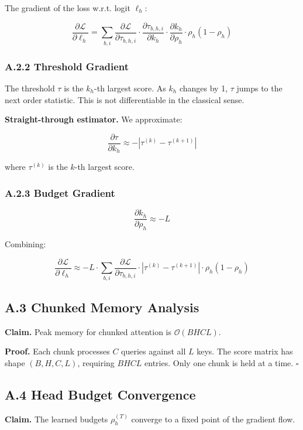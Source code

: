 The gradient of the loss w.r.t. logit $\ell_h$:

\[
\frac{\partial \mathcal{L}}{\partial \ell_h} = \sum_{b, i} \frac{\partial \mathcal{L}}{\partial \tau_{b, h, i}} \cdot \frac{\partial \tau_{b, h, i}}{\partial k_h} \cdot \frac{\partial k_h}{\partial \rho_h} \cdot \rho_h (1 - \rho_h)
\]

\subsubsection{A.2.2 Threshold Gradient}

The threshold $\tau$ is the $k_h$-th largest score. As $k_h$ changes by 1, 
$\tau$ jumps to the next order statistic. This is not differentiable in 
the classical sense.

\textbf{Straight-through estimator.} We approximate:

\[
\frac{\partial \tau}{\partial k_h} \approx -|\tau^{(k)} - \tau^{(k+1)}|
\]

where $\tau^{(k)}$ is the $k$-th largest score.

\subsubsection{A.2.3 Budget Gradient}

\[
\frac{\partial k_h}{\partial \rho_h} \approx -L
\]

Combining:

\[
\frac{\partial \mathcal{L}}{\partial \ell_h} \approx -L \cdot \sum_{b, i} \frac{\partial \mathcal{L}}{\partial \tau_{b, h, i}} \cdot |\tau^{(k)} - \tau^{(k+1)}| \cdot \rho_h (1 - \rho_h)
\]

\subsection{A.3 Chunked Memory Analysis}

\textbf{Claim.} Peak memory for chunked attention is $\mathcal{O}(B H C L)$.

\textbf{Proof.} Each chunk processes $C$ queries against all $L$ keys. The score 
matrix has shape $(B, H, C, L)$, requiring $B H C L$ entries. Only one chunk 
is held at a time. $\square$

\subsection{A.4 Head Budget Convergence}

\textbf{Claim.} The learned budgets $\rho_h^{(T)}$ converge to a fixed point of 
the gradient flow.

